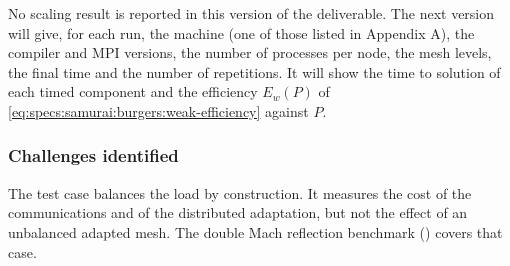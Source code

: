 No scaling result is reported in this version of the deliverable. The next
version will give, for each run, the machine (one of those listed in Appendix A),
the compiler and MPI versions, the number of processes per node, the mesh
levels, the final time and the number of repetitions. It will show the time to
solution of each timed component and the efficiency $E_w(P)$ of
\eqref{eq:specs:samurai:burgers:weak-efficiency} against $P$.




\subsubsection{Challenges identified}

The test case balances the load by construction. It measures the cost of
the communications and of the distributed adaptation, but not the effect of
an unbalanced adapted mesh. The double Mach reflection benchmark
() covers that case.
